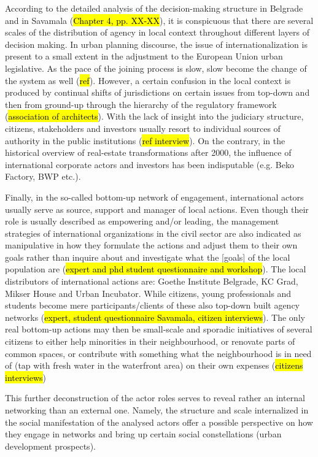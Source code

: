 \documentclass[11pt]{report}
\begin{document}
According to the detailed analysis of the decision-making structure in Belgrade and in Savamala (\hl{Chapter 4, pp. XX-XX}), it is conspicuous that there are several scales of the distribution of agency in local context throughout different layers of decision making.
In urban planning discourse, the issue of internationalization is present to a small extent in the adjustment to the European Union urban legislative. As the pace of the joining process is slow, slow become the change of the system as well (\hl{ref}). 
However, a certain confusion in the local context is produced by continual shifts of jurisdictions on certain issues from top-down and then from ground-up through the hierarchy of the regulatory framework (\hl{association of architects}).
With the lack of insight into the judiciary structure, citizens, stakeholders and investors usually resort to individual sources of authority in the public institutions (\hl{ref interview}).
On the contrary, in the historical overview of real-estate transformations after 2000, the influence of international corporate actors and investors has been indisputable (e.g. Beko Factory, BWP etc.).

Finally, in the so-called bottom-up network of engagement, international actors usually serve as source, support and manager of local actions.
Even though their role is usually described as empowering and/or leading, the management strategies of international organizations in the civil sector are also indicated as manipulative in how they formulate the actions and adjust them to their own goals rather than inquire about and investigate what the [goals] of the local  population are (\hl{expert and phd student questionnaire and workshop}).
The local distributors of international actions are: Goethe Institute Belgrade, KC Grad, Mikser House and Urban Incubator.
While citizens, young professionals and students become mere participants/clients of these also top-down built agency networks (\hl{expert, student questionnaire Savamala, citizen interviews}).
The only real bottom-up actions may then be small-scale and sporadic initiatives of several citizens to either help minorities in their neighbourhood, or renovate parts of common spaces, or contribute with something what the neighbourhood is in need of (tap with fresh water in the waterfront area) on their own expenses (\hl{citizens interviews})

This further deconstruction of the actor roles serves to reveal rather an internal networking than an external one. Namely, the structure and scale internalized in the social manifestation of the analysed actors offer a possible perspective on how they engage in networks and bring up certain social constellations (urban development prospects).
\end{document}
